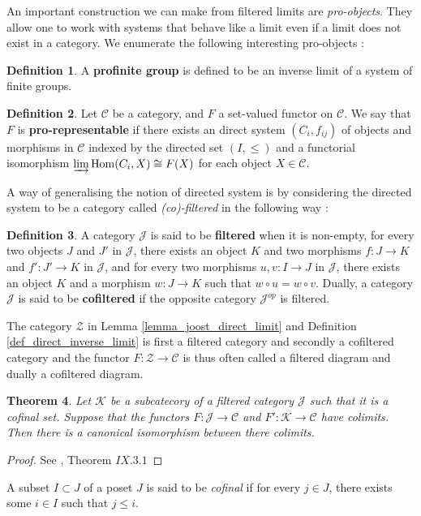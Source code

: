 \documentclass{article}
\theoremstyle{plain}
\newtheorem{theorem}{Theorem}[subsection]
\theoremstyle{definition}
\newtheorem{definition}[theorem]{Definition}
\DeclareMathOperator{\Hom}{Hom}
\begin{document}
\noindent An important construction we can make from filtered limits are \textit{pro-objects}. They allow one to work with systems that behave like a limit even if a limit does not exist in a category. 
We enumerate the following interesting pro-objects :

\begin{definition}
\label{profinite_group}
A \textbf{profinite group} is defined to be an inverse limit of a system of finite groups.
\end{definition}

\begin{definition}
\label{pro_representable}
    Let $\mathcal{C}$ be a category, and $F$ a set-valued functor on $\mathcal{C}$.
    We say that $F$ is \textbf{pro-representable} if there exists an direct system $(C_i , f_{ij})$ of objects and morphisms in $ \mathcal{C}$ indexed by the directed set $(I,\leq)$ and a functorial isomorphism $\varinjlim \Hom(C_i, X) \cong F(X)$ for each object $X\in \mathcal{C}$.
\end{definition}

\noindent A way of generalising the notion of directed system is by considering the directed system to be a category called \textit{(co)-filtered} in the following way :

\begin{definition}
    A category $\mathcal{J}$ is said to be \textbf{filtered} when 
    it is non-empty,
    for every two objects $J$ and $J'$ in $\mathcal{J}$, there exists an object $K$ and two morphisms $f:J\rightarrow K$ and $f':J'\rightarrow K$ in $\mathcal{J}$, and
    for every two morphisms $u,v:I\rightarrow J$ in $\mathcal{J}$, there exists an object $K$ and a morphism $w:J\rightarrow K$ such that $w\circ u = w\circ v$.
    Dually, a category $\mathcal{J}$ is said to be \textbf{cofiltered} if the opposite category $\mathcal{J}^{op}$ is filtered.
\end{definition}


\noindent The category $\mathcal{Z}$ in Lemma \ref{lemma_joost_direct_limit} and Definition \ref{def_direct_inverse_limit} is first a filtered category and secondly a cofiltered category and the functor $F:\mathcal{Z}\rightarrow \mathcal{C}$ is thus often called a filtered diagram and dually a cofiltered diagram.


\begin{theorem}
\label{cofinal_identic_colim}
    Let $\mathcal{K}$ be a subcatecory of a filtered category $\mathcal{J}$ such that it is a cofinal set.
    Suppose that the functors $F:\mathcal{J}\rightarrow \mathcal{C}$ and $F':\mathcal{K}\rightarrow \mathcal{C}$ have colimits.
    Then there is a canonical isomorphism between there colimits.
\end{theorem}
\begin{proof}
    See \cite{McLane_Sau}, Theorem $IX.3.1$ 
\end{proof}
\noindent A subset $I \subset J$ of a poset $J$ is said to be \textit{cofinal} if for every $j\in J$, there exists some $i\in I$ such that $j\leq i$.
\end{document}
